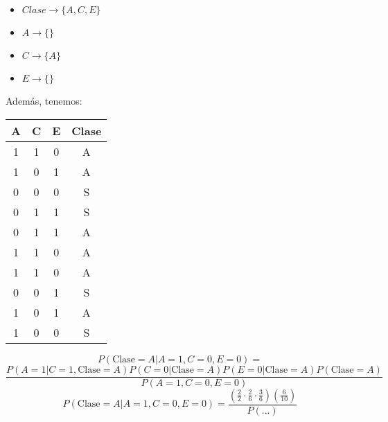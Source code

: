 \begin{problem}

\begin{itemize}
	\item $Clase \to \{A,C,E\}$
	\item $A \to \{\}$
	\item $C \to \{A\}$
	\item $E \to \{\}$
\end{itemize}

Además, tenemos:

\begin{center}
\begin{tabular}{ccc|c}
A&C&E&Clase\\
\hline
1&1&0&A \\
1&0&1&A \\
0&0&0&S \\
0&1&1&S \\
0&1&1&A \\
1&1&0&A \\
1&1&0&A \\
0&0&1&S \\
1&0&1&A \\
1&0&0&S \\
\end{tabular}
\end{center}

\solution


\[P(\text{Clase}=A | A=1,C=0, E=0) = \]
\[\frac{P(A=1|C=1,\text{Clase} = A) P(C=0|\text{Clase} = A) P (E=0 | \text{Clase} = A) P (\text{Clase}= A)}{P(A=1,C=0,E=0)}\]
$$P(\text{Clase}=A | A=1,C=0, E=0) = \frac{\left(\frac{2}{2}·\frac{2}{6}·\frac{3}{6}\right)\left(\frac{6}{10}\right)}{P(...)}$$

\end{problem}